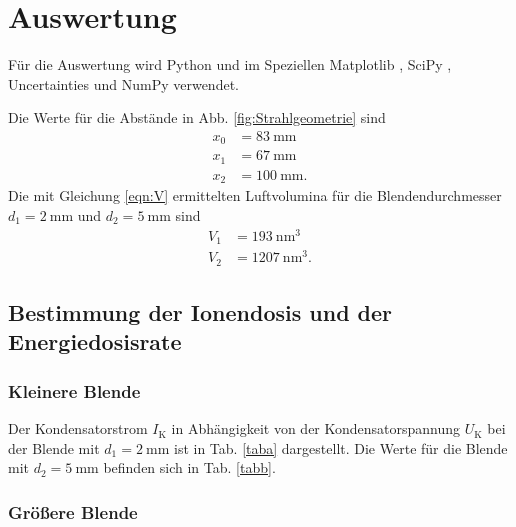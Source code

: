 \section{Auswertung}
\label{sec:Auswertung}

Für die Auswertung wird Python und im Speziellen
Matplotlib \cite{matplotlib}, SciPy \cite{scipy},
Uncertainties \cite{uncertainties} und NumPy \cite{numpy} verwendet.

\noindent Die Werte für die Abstände in Abb. \ref{fig:Strahlgeometrie} sind
\begin{align*}
    x_0 &= \SI{83}{\milli\meter} \\
    x_1 &= \SI{67}{\milli\meter} \\
    x_2 &= \SI{100}{\milli\meter}.
\end{align*}
Die mit Gleichung \eqref{eqn:V} ermittelten Luftvolumina
für die Blendendurchmesser $d_1 = \SI{2}{\milli\meter}$ und
$d_2 = \SI{5}{\milli\meter}$ sind
\begin{align*}
    V_1 &= \SI{193}{\nano\meter\cubed} \\
    V_2 &= \SI{1207}{\nano\meter\cubed}.
\end{align*}


\subsection{Bestimmung der Ionendosis und der Energiedosisrate}

\subsubsection{Kleinere Blende}
Der Kondensatorstrom $I_\text{K}$ in Abhängigkeit von der
Kondensatorspannung $U_\text{K}$ bei der Blende mit
$d_1 = \SI{2}{\milli\meter}$ ist in Tab. \ref{taba}
dargestellt. Die Werte für die Blende mit 
$d_2 = \SI{5}{\milli\meter}$ befinden sich in Tab. \ref{tabb}.



\subsubsection{Größere Blende}


